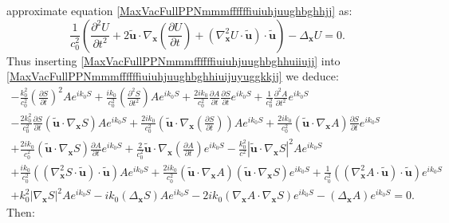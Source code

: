 \documentclass{article}
\theoremstyle{definition}
\theoremstyle{remark}
\renewcommand{\vec}[1]{\mathbf{#1}}
\newcommand{\er}{\eqref}
\newcommand{\er}{\eqref}
\begin{document}
approximate equation \er{MaxVacFullPPNmmmffffffiuiuhjuughbghhjj} as:
\begin{equation}\label{MaxVacFullPPNmmmffffffiuiuhjuughbghhiuijuyuggkkjj}
\frac{1}{c^2_0}\left(\frac{\partial^2 U}{\partial t^2}+2\vec {\tilde
u}\cdot\nabla_{\vec x}\left(\frac{\partial U}{\partial
t}\right)+\left(\nabla^2_{\vec x}U\cdot\vec {\tilde
u}\right)\cdot\vec {\tilde u}\right)-\Delta_{\vec x}U=0.
\end{equation}
Thus inserting \er{MaxVacFullPPNmmmffffffiuiuhjuughbghhuiiujj} into
\er{MaxVacFullPPNmmmffffffiuiuhjuughbghhiuijuyuggkkjj} we deduce:
\begin{multline}\label{MaxVacFullPPNmmmffffffiuiuhjuughbghhiuijjj}
-\frac{k^2_0}{c^2_0}\left(\frac{\partial S}{\partial
t}\right)^2Ae^{ik_0S}+\frac{ik_0}{c^2_0}\left(\frac{\partial^2
S}{\partial t^2}\right)Ae^{ik_0S}+\frac{2ik_0}{c^2_0}\frac{\partial
A}{\partial t}\frac{\partial S}{\partial
t}e^{ik_0S}+\frac{1}{c^2_0}\frac{\partial^2 A}{\partial
t^2}e^{ik_0S}
\\-\frac{2k^2_0}{c^2_0}\frac{\partial S}{\partial
t}\left(\vec {\tilde u}\cdot\nabla_{\vec
x}S\right)Ae^{ik_0S}+\frac{2ik_0 }{c^2_0}\left(\vec {\tilde u}\cdot
\nabla_{\vec x}\left(\frac{\partial S}{\partial
t}\right)\right)Ae^{ik_0S}+\frac{2ik_0}{c^2_0}\left(\vec {\tilde
u}\cdot\nabla_{\vec x}A\right)\frac{\partial S}{\partial
t}e^{ik_0S}\\+\frac{2ik_0}{c^2_0}\left(\vec {\tilde
u}\cdot\nabla_{\vec x}S\right)\frac{\partial A}{\partial
t}e^{ik_0S}+\frac{2}{c^2_0}\vec {\tilde u}\cdot\nabla_{\vec
x}\left(\frac{\partial A}{\partial
t}\right)e^{ik_0S}-\frac{k^2_0}{c^2}\left|\vec {\tilde
u}\cdot\nabla_{\vec
x}S\right|^2Ae^{ik_0S}\\+\frac{ik_0}{c^2_0}\left(\left(\nabla^2_{\vec
x}S\cdot\vec {\tilde u}\right)\cdot\vec {\tilde
u}\right)Ae^{ik_0S}+\frac{2ik_0}{c^2_0}\left(\vec {\tilde
u}\cdot\nabla_{\vec x}A\right)\left(\vec {\tilde u}\cdot\nabla_{\vec
x}S\right)e^{ik_0S}+\frac{1}{c^2_0}\left(\left(\nabla^2_{\vec
x}A\cdot\vec {\tilde u}\right)\cdot\vec {\tilde
u}\right)e^{ik_0S}\\+k^2_0\left|\nabla_{\vec
x}S\right|^2Ae^{ik_0S}-ik_0\left(\Delta_{\vec
x}S\right)Ae^{ik_0S}-2ik_0\left(\nabla_{\vec x}A\cdot\nabla_{\vec
x}S\right)e^{ik_0S}-\left(\Delta_{\vec x}A\right)e^{ik_0S}=0.
\end{multline}
Then:
\end{document}
